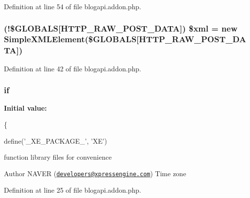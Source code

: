 Definition at line 54 of file blogapi.\+addon.\+php.

\hypertarget{blogapi_8addon_8php_a14ad998c59a6fcbcc09adbc67c7abb85}{}
\subsubsection[{\$xml}]{ (!\$G\+L\+O\+B\+A\+L\+S\mbox{[}\textquotesingle{}H\+T\+T\+P\+\_\+\+R\+A\+W\+\_\+\+P\+O\+S\+T\+\_\+\+D\+A\+T\+A\textquotesingle{}\mbox{]}) \$xml = new Simple\+X\+M\+L\+Element(\$G\+L\+O\+B\+A\+L\+S\mbox{[}\textquotesingle{}H\+T\+T\+P\+\_\+\+R\+A\+W\+\_\+\+P\+O\+S\+T\+\_\+\+D\+A\+T\+A\textquotesingle{}\mbox{]})}\label{blogapi_8addon_8php_a14ad998c59a6fcbcc09adbc67c7abb85}


Definition at line 42 of file blogapi.\+addon.\+php.

\hypertarget{blogapi_8addon_8php_ae00067f6d78515f89a86a2a7f42cdc80}{}
\subsubsection[{if}]{\setlength{\rightskip}{0pt plus 5cm}if}\label{blogapi_8addon_8php_ae00067f6d78515f89a86a2a7f42cdc80}
{\bfseries Initial value\+:}
\begin{DoxyCode}
\{
    
    define(\textcolor{stringliteral}{'\_XE\_PACKAGE\_'}, \textcolor{stringliteral}{'XE'})
\end{DoxyCode}
function library files for convenience

\begin{DoxyAuthor}{Author}
N\+A\+V\+E\+R (\href{mailto:developers@xpressengine.com}{\tt developers@xpressengine.\+com}) Time zone 
\end{DoxyAuthor}


Definition at line 25 of file blogapi.\+addon.\+php.

